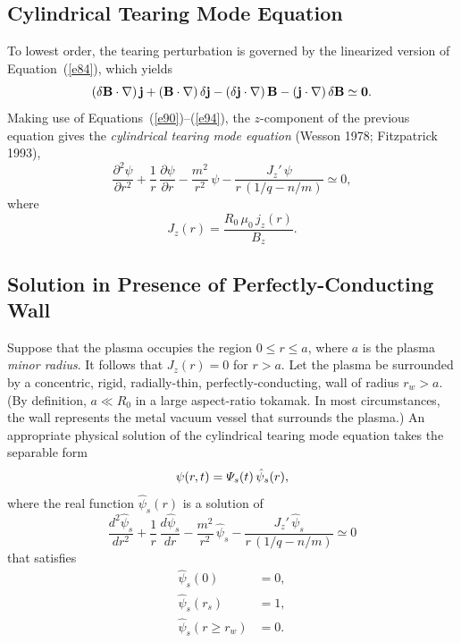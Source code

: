 \documentclass[notitlepage,12pt]{article}
\begin{document}
\subsection{Cylindrical Tearing Mode Equation}
To lowest order, the tearing perturbation is governed by the linearized version of Equation~(\ref{e84}), which yields
\begin{equation}\label{e96}
(\delta{\bf B}\cdot \nabla)\,{\bf j} + ({\bf B}\cdot\nabla)\,\delta{\bf j} - (\delta{\bf j}\cdot\nabla)\,{\bf B} - 
({\bf j}\cdot\nabla)\,\delta {\bf B}\simeq {\bf 0}.
\end{equation}
Making use of Equations~(\ref{e90})--(\ref{e94}), the $z$-component of the previous equation gives
the {\em cylindrical tearing mode equation}\/ (Wesson 1978; Fitzpatrick 1993),
\begin{equation}
\frac{\partial^2\psi}{\partial r^2} + \frac{1}{r}\,\frac{\partial\psi}{\partial r}-\frac{m^2}{r^2}\,\psi - \frac{J_z'\,\psi}{r\,(1/q-n/m)}\simeq 0,
\end{equation}
where 
\begin{equation}
J_z(r)= \frac{R_0\,\mu_0\,j_z(r)}{B_z}.
\end{equation}

\subsection{Solution in Presence of Perfectly-Conducting Wall}\label{perfect}
Suppose that the plasma occupies the region $0\leq r\leq a$, where $a$ is the plasma {\em minor radius}. It follows that
$J_z(r)=0$ for $r>a$. Let the plasma be surrounded by a concentric, rigid, radially-thin, perfectly-conducting, wall of radius $r_w>a$. 
(By definition, $a\ll R_0$ in a large aspect-ratio tokamak. In most circumstances, the wall represents the metal vacuum vessel that surrounds  the plasma.) An appropriate
physical solution of the cylindrical tearing mode equation takes the separable form
\begin{equation}\label{e99}
\psi(r,t)= {\mit\Psi}_s(t)\,\hat{\psi}_s(r),
\end{equation}
where the real function $\hat{\psi}_s(r)$ is a solution of 
\begin{equation}\label{e100}
\frac{d^2\hat{\psi}_s}{dr^2} + \frac{1}{r}\,\frac{d\hat{\psi}_s}{dr}-\frac{m^2}{r^2}\,\hat{\psi}_s - \frac{J_z'\,\hat{\psi}_s}{r\,(1/q-n/m)}\simeq 0
\end{equation}
that satisfies
\begin{align}\label{e101}
\hat{\psi}_s(0) &= 0,\\[0.5ex]
\hat{\psi}_s(r_s) &= 1,\label{e102}\\[0.5ex]
\hat{\psi}_s(r\geq r_w) &= 0.\label{e103}
\end{align}
\end{document}
